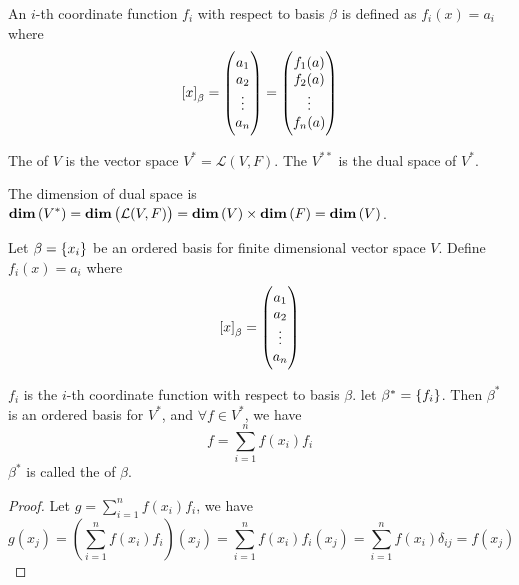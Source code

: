 \begin{definition}
	An $i$-th coordinate function $f_i$ with respect to basis $\beta$ is defined as $f_i(x) = a_i$ where
	\begin{equation*}
		\coordinate{x}_\beta = \begin{pmatrix}
			a_1 \\
			a_2 \\
			\vdots \\
			a_n
		\end{pmatrix} = \begin{pmatrix}
			f_1(a) \\
			f_2(a) \\
			\vdots \\
			f_n(a)
		\end{pmatrix}
	\end{equation*}
\end{definition}



\begin{definition}
	The \label{dualspacedefinition} of $V$ is the vector space $V^* = \mathcal{L}(V,F)$. The  $V^{**}$ is the dual space of $V^*$.
\end{definition}


The dimension of dual space is $\displaystyle \mathbf{dim}\left( V^* \right) = \displaystyle \mathbf{dim}\left( \mathcal{L}(V,F) \right) = \displaystyle \mathbf{dim}\left( V \right) \times \displaystyle \mathbf{dim}\left( F \right) = \displaystyle \mathbf{dim}\left( V \right)$.

\begin{definition}
	Let $\beta = \set{x_i}$ be an ordered basis for finite dimensional vector space $V$. Define $f_i (x) = a_i$ where
	\begin{equation*}
	    \coordinate{x}_\beta = \begin{pmatrix}
	        a_1 \\
	        a_2 \\
	        \vdots \\
	        a_n
	    \end{pmatrix}
	\end{equation*}
	
	$f_i$ is the $i$-th coordinate function with respect to basis $\beta$. let $\beta^*=\set{f_i}$. Then $\beta^*$ is an ordered basis for $V^*$, and $\forall f \in V^*$, we have
	\begin{equation}
		f = \sum_{i=1}^n f(x_i) f_i
	\end{equation}
	$\beta^*$ is called the  of $\beta$.
\end{definition}
\begin{proof}
	Let $g =\displaystyle \sum_{i=1}^n f(x_i) f_i$, we have
	\begin{equation*}
	g(x_j) = \left( \sum_{i=1}^n f(x_i) f_i \right) (x_j) = \sum_{i=1}^n f(x_i) f_i (x_j) = \sum_{i=1}^n f(x_i) \delta_{ij} =f(x_j)
	\end{equation*}
\end{proof}


